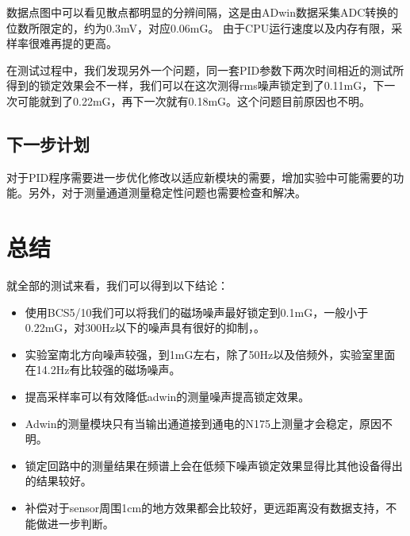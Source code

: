 \documentclass[onecolumn,a4paper,10pt]{article}
\begin{document}
数据点图中可以看见散点都明显的分辨间隔，这是由ADwin数据采集ADC转换的位数所限定的，约为0.3mV，对应0.06mG。
由于CPU运行速度以及内存有限，采样率很难再提的更高。

在测试过程中，我们发现另外一个问题，同一套PID参数下两次时间相近的测试所得到的锁定效果会不一样，我们可以在这次测得rms噪声锁定到了0.11mG，下一次可能就到了0.22mG，再下一次就有0.18mG。这个问题目前原因也不明。

\subsection{下一步计划}

对于PID程序需要进一步优化修改以适应新模块的需要，增加实验中可能需要的功能。另外，对于测量通道测量稳定性问题也需要检查和解决。

\section{总结}

就全部的测试来看，我们可以得到以下结论：
\begin{itemize}
\item 使用BCS5/10我们可以将我们的磁场噪声最好锁定到0.1mG，一般小于0.22mG，对300Hz以下的噪声具有很好的抑制，。
\item 实验室南北方向噪声较强，到1mG左右，除了50Hz以及倍频外，实验室里面在14.2Hz有比较强的磁场噪声。
\item 提高采样率可以有效降低adwin的测量噪声提高锁定效果。
\item Adwin的测量模块只有当输出通道接到通电的N175上测量才会稳定，原因不明。
\item 锁定回路中的测量结果在频谱上会在低频下噪声锁定效果显得比其他设备得出的结果较好。
\item 补偿对于sensor周围1cm的地方效果都会比较好，更远距离没有数据支持，不能做进一步判断。
\end{itemize}





\end{document}
